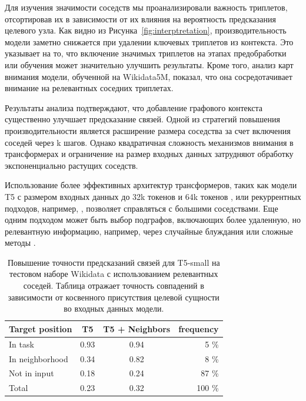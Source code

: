 Для изучения значимости соседств мы проанализировали важность триплетов, отсортировав их в зависимости от их влияния на вероятность предсказания целевого узла. Как видно из Рисунка~\ref{fig:interptretation}, производительность модели заметно снижается при удалении ключевых триплетов из контекста. Это указывает на то, что включение значимых триплетов на этапах предобработки или обучения может значительно улучшить результаты. Кроме того, анализ карт внимания модели, обученной на Wikidata5M, показал, что она сосредотачивает внимание на релевантных соседних триплетах.

Результаты анализа подтверждают, что добавление графового контекста существенно улучшает предсказание связей. Одной из стратегий повышения производительности является расширение размера соседства за счет включения соседей через k шагов. Однако квадратичная сложность механизмов внимания в трансформерах и ограничение на размер входных данных затрудняют обработку экспоненциально растущих соседств.

Использование более эффективных архитектур трансформеров, таких как модели T5 с размером входных данных до 32k токенов \cite{guo-etal-2022-longt5} и 64k токенов \cite{ainslie2023colt5}, или рекуррентных подходов, например, \cite{rmt_2022,hutchins2022blockrecurrent}, позволяет справляться с большими соседствами. Еще одним подходом может быть выбор подграфов, включающих более удаленную, но релевантную информацию, например, через случайные блуждания или сложные методы \cite{das2018minerva}.

\begin{table}%
  \caption{Повышение точности предсказаний связей для T5-small на тестовом наборе Wikidata с использованием релевантных соседей. Таблица отражает точность совпадений в зависимости от косвенного присутствия целевой сущности во входных данных модели.}
  \label{tab:target_inclusion}
  \begin{tabular}{lccr}
    \toprule
    Target position &  T5 & T5 + Neighbors & frequency\\
    \midrule
    In task         & 0.93 & 0.94 \up & 5 \%  \\
    In neighborhood & 0.34 & 0.82 \up & 8 \% \\
    Not in input    & 0.18 & 0.24 \up & 87 \% \\
    Total           & 0.23 & 0.32 \up & 100 \% \\
  \bottomrule
\end{tabular}
\vskip -0.1in
\end{table}

